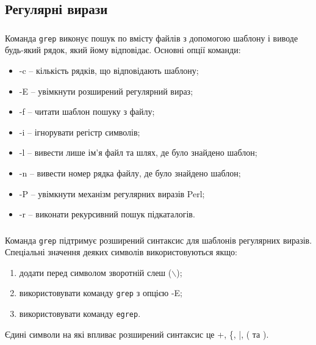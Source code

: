 \documentclass[t]{beamer}  %
\begin{document}
\subsection{Регулярні вирази}
\begin{frame}
  \frametitle{\insertsection} 
	\framesubtitle{\insertsubsection}
	Команда \texttt{grep} виконує пошук по вмісту файлів з допомогою шаблону і виводе будь-який рядок, який йому відповідає. Основні опції команди:
	\begin{itemize}
	  \item -c -- кількість рядків, що відповідають шаблону;
	  \item -E -- увімкнути розширений регулярний вираз;
	  \item -f -- читати шаблон пошуку з файлу;
	  \item -i -- ігнорувати регістр символів;
	  \item -l -- вивести лише ім'я файл та шлях, де було знайдено шаблон;
	  \item -n -- вивести номер рядка файлу, де було знайдено шаблон;
	  \item -P -- увімкнути механізм регулярних виразів Perl;
	  \item -r -- виконати рекурсивний пошук підкаталогів.
	\end{itemize}
\end{frame}

\begin{frame}
  \frametitle{\insertsection} 
	\framesubtitle{\insertsubsection}
	Команда \texttt{grep} підтримує розширений синтаксис для шаблонів регулярних виразів. Спеціальні значення деяких символів використовуються якщо:  
\begin{enumerate}
	  \item додати перед символом зворотній слеш ($\backslash$);
	  \item використовувати команду \texttt{grep} з опцією -E;
	  \item використовувати команду \texttt{egrep}.
\end{enumerate}

Єдині символи на які впливає розширений синтаксис це +, \{,  |, ( та ).
		  
\end{frame}
\end{document}
